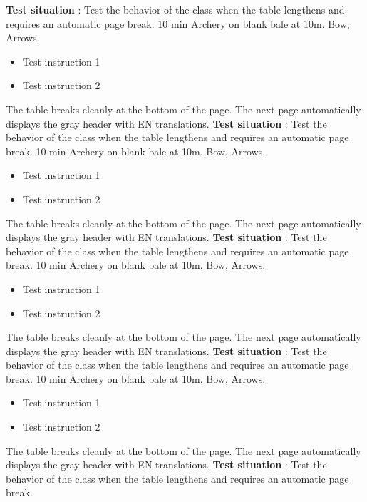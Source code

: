 \documentclass{../tex/ficheseance}
\begin{document}
	
	\makeficheheader
	
	\begin{tableauSeance}		
		\ligneSeance
		{\textbf{Test situation} : Test the behavior of the class when the table lengthens and requires an automatic page break.}
		{10 min}
		{Archery on blank bale at 10m.}
		{Bow, Arrows.}
		{\begin{itemize}
			\item Test instruction 1
			\item Test instruction 2
		\end{itemize}}
		{The table breaks cleanly at the bottom of the page.}
		{The next page automatically displays the gray header with EN translations.}		
		\ligneSeance
		{\textbf{Test situation} : Test the behavior of the class when the table lengthens and requires an automatic page break.}
		{10 min}
		{Archery on blank bale at 10m.}
		{Bow, Arrows.}
		{\begin{itemize}
			\item Test instruction 1
			\item Test instruction 2
		\end{itemize}}
		{The table breaks cleanly at the bottom of the page.}
		{The next page automatically displays the gray header with EN translations.}		
		\ligneSeance
		{\textbf{Test situation} : Test the behavior of the class when the table lengthens and requires an automatic page break.}
		{10 min}
		{Archery on blank bale at 10m.}
		{Bow, Arrows.}
		{\begin{itemize}
			\item Test instruction 1
			\item Test instruction 2
		\end{itemize}}
		{The table breaks cleanly at the bottom of the page.}
		{The next page automatically displays the gray header with EN translations.}		
		\ligneSeance
		{\textbf{Test situation} : Test the behavior of the class when the table lengthens and requires an automatic page break.}
		{10 min}
		{Archery on blank bale at 10m.}
		{Bow, Arrows.}
		{\begin{itemize}
			\item Test instruction 1
			\item Test instruction 2
		\end{itemize}}
		{The table breaks cleanly at the bottom of the page.}
		{The next page automatically displays the gray header with EN translations.}		
		\ligneSeance
		{\textbf{Test situation} : Test the behavior of the class when the table lengthens and requires an automatic page break.}

\end{tableauSeance}
\end{document}
